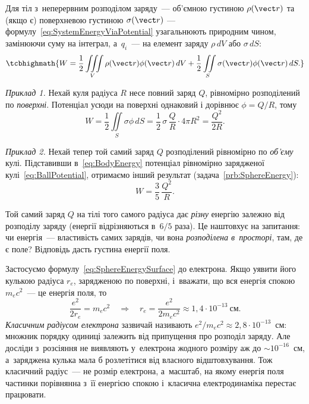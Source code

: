 Для тіл з~неперервним розподілом заряду~--- об'ємною густиною $\rho(\vect r)$ та (якщо є)
поверхневою густиною $\sigma(\vect r)$ --- формулу~\eqref{eq:SystemEnergyViaPotential}
узагальнюють природним чином, замінюючи суму на інтеграл, а~$q_i$~--- на елемент заряду
$\rho\, dV$ або $\sigma\, dS$:
\begin{equation}\label{eq:BodyEnergy}
	\tcbhighmath{
		W = \frac12 \iiint\limits_V \rho(\vect r)\phi(\vect r)\, dV + \frac12 \iint\limits_S \sigma(\vect r)\phi(\vect r)\, dS.
	}
\end{equation}

\emph{Приклад 1.} Нехай куля радіуса $R$ несе повний заряд $Q$, рівномірно розподілений
по \emph{поверхні}. Потенціал усюди на поверхні однаковий і дорівнює $\phi = Q/R$, тому
\begin{equation}\label{eq:SphereEnergySurface}
	W = \frac12 \iint\limits_S \sigma\phi\, dS = \frac12\, \sigma\, \frac{Q}{R}\cdot 4\pi R^2 = \frac{Q^2}{2R}.
\end{equation}

\emph{Приклад 2.} Нехай тепер той самий заряд $Q$ розподілений рівномірно по
\emph{об'єму} кулі. Підставивши в~\eqref{eq:BodyEnergy} потенціал рівномірно зарядженої
кулі~\eqref{eq:BallPotential}, отримаємо інший результат (задача~\ref{prb:SphereEnergy}):
\begin{equation}\label{eq:SphereEnergyVolume}
	W = \frac35\, \frac{Q^2}{R}.
\end{equation}

Той самий заряд $Q$ на тілі того самого радіуса дає \emph{різну} енергію залежно від
розподілу заряду (енергії відрізняються в~$6/5$ раза). Це наштовхує на запитання: чи
енергія~--- властивість самих зарядів, чи вона \emph{розподілена в~просторі}, там, де є
поле? Відповідь дасть густина енергії поля.

Застосуємо формулу~\eqref{eq:SphereEnergySurface} до електрона. Якщо уявити його кулькою радіуса $r_e$, зарядженою по
поверхні, і~вважати, що вся енергія спокою $m_ec^2$~--- це енергія поля, то
\begin{equation*}
	\frac{e^2}{2r_e} = m_ec^2 \quad\Longrightarrow\quad r_e = \frac{e^2}{2m_ec^2}\approx1{,}4\cdot10^{-13}~\text{см}.
\end{equation*}
\emph{Класичним радіусом електрона} зазвичай називають
$e^2/m_ec^2\approx2{,}8\cdot10^{-13}$~см: множник порядку одиниці залежить від припущення
про розподіл заряду. Але досліди з~розсіяння не виявляють у~електрона жодного розміру аж до
$\sim10^{-16}$~см, а~заряджена кулька мала б розлетітися від власного відштовхування. Тож
класичний радіус~--- не розмір електрона, а~масштаб, на якому енергія поля частинки
порівнянна з~її енергією спокою і~класична електродинаміка перестає працювати.



